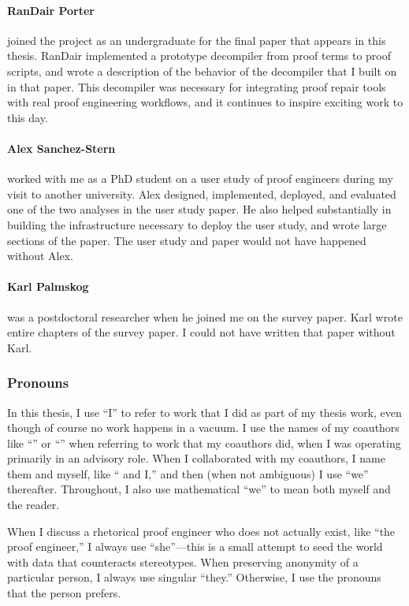 \paragraph{RanDair Porter}
 joined the project as an undergraduate for the final paper that appears in this thesis.
RanDair implemented a prototype decompiler from proof terms to proof scripts,
and wrote a description of the behavior of the decompiler that I built on in that paper.
This decompiler was necessary for integrating proof repair tools with real proof engineering workflows,
and it continues to inspire exciting work to this day.

\paragraph{Alex Sanchez-Stern}
 worked with me as a PhD student on a user study of proof engineers during my visit to another university.
Alex designed, implemented, deployed, and evaluated one of the two analyses in the user study paper.
He also helped substantially in building the infrastructure necessary to deploy the user study,
and wrote large sections of the paper.
The user study and paper would not have happened without Alex.

\paragraph{Karl Palmskog}
 was a postdoctoral researcher when he joined me on the survey paper.
Karl wrote entire chapters of the survey paper.
I could not have written that paper without Karl.

\subsubsection*{Pronouns}

In this thesis, I use ``I'' to refer to work that I did as part of my thesis work,
even though of course no work happens in a vacuum.
I use the names of my coauthors like ``'' or ``'' when referring to work that my coauthors did,
when I was operating primarily in an advisory role.
When I collaborated with my coauthors, I name them and myself, like `` and I,''
and then (when not ambiguous) I use ``we'' thereafter.
Throughout, I also use mathematical ``we'' to mean both myself and the reader.

When I discuss a rhetorical proof engineer who does not actually exist,
like ``the proof engineer,'' I always use ``she''---this is a small attempt
to seed the world with data that counteracts stereotypes. 
When preserving anonymity of a particular person, I always use singular ``they.''
Otherwise, I use the pronouns that the person prefers.



